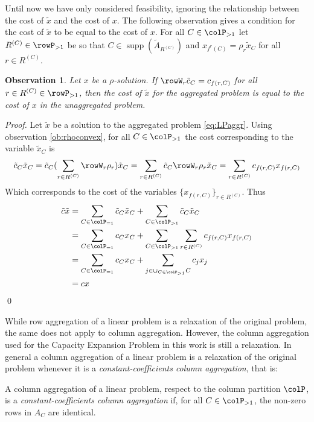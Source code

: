 \documentclass[smallextended,natbib]{svjour3}       %
\newtheorem{observation}[theorem]{Observation}
\DeclareMathOperator{\supp}{supp}
\numberwithin{theorem}{section}
\begin{document}
Until now we have only considered feasibility, ignoring the relationship between the cost of \(\tilde{x}\) and the cost of \(x\). The following observation gives a condition for the cost of \(\tilde{x}\) to be equal to the cost of \(x\).
For all \(C \in \colP_{>1}\) let  \(R^{(C)} \in \rowP_{>1}\) be so that \(C \in \supp(\tilde{A}_{R^{(C)}})\) and \(x_{f^r(C)} = \rho_r \tilde{x}_C\) for all \(r \in R^{(C)}\).
\begin{observation}
  \label{ob:costpreserving}
  Let \(x\) be a \(\rho\)-solution. If  \(\rowW_r\tilde{c}_C = c_{f(r,C)}\) for all \(r \in R^{(C)} \in \rowP_{>1}\), then the cost of \(\tilde{x}\) for the aggregated problem 
  is equal to the cost of \(x\) in the unaggregated problem. 
\end{observation}
\begin{proof}
  Let \(\tilde{x}\) be a solution to the aggregated problem \eqref{eq:LPaggr}. Using observation \ref{ob:rhoconvex}, for all \(C \in \colP_{>1}\) the cost corresponding to the variable \(\tilde{x}_C\) is 
  \[
  \tilde{c}_C\tilde{x}_C = \tilde{c}_C(\sum_{r \in R^{(C)}}\rowW_r\rho_r)\tilde{x}_C = \sum_{r \in R^{(C)}}\tilde{c}_C\rowW_r\rho_r\tilde{x}_C  = \sum_{r \in R^{(C)}}c_{f(r,C)}x_{f(r,C)}
  \]
  Which corresponds to the cost of the variables \(\{x_{f(r,C)}\}_{r \in R^{(C)}}\). Thus
  \begin{align*}
  \tilde{c}\tilde{x} &= \sum_{C \in \colP_{=1}}\tilde{c}_C\tilde{x}_C + \sum_{C \in \colP_{>1}}\tilde{c}_C\tilde{x}_C \\
                    &= \sum_{C \in \colP_{=1}}c_Cx_C + \sum_{C \in \colP_{>1}}\sum_{r \in R^{(C)}}c_{f(r,C)}x_{f(r,C)} \\
                    &= \sum_{C \in \colP_{=1}}c_Cx_C + \sum_{j \in \cup_{C \in \colP_{>1}}C}c_{j}x_{j} \\
                    &= cx
  \end{align*}
\qed
\end{proof}


While row aggregation of a linear problem is a relaxation of the original problem, the same does not apply to column aggregation. However, the column aggregation used for the  Capacity Expansion Problem in this work is still a relaxation. In general a column aggregation of a linear problem is a relaxation of the original problem whenever it is a \emph{constant-coefficients column aggregation}, that is:
\begin{definition}
  A column aggregation of a linear problem, respect to the column partition \(\colP\), is a \emph{constant-coefficients column aggregation} if, for all \(C \in \colP_{>1}\), the non-zero rows in \(A_C\) are identical.
\end{definition}
\end{document}
